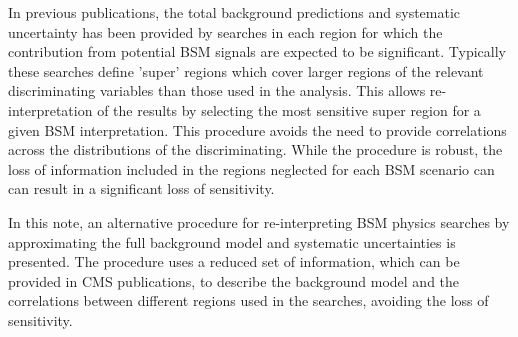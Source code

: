 In previous publications, the total background predictions  
and systematic uncertainty has been provided by searches in each region for which the contribution 
from potential BSM signals are expected to be significant. 
Typically these searches define 'super' regions which cover larger regions of the relevant discriminating variables 
than those used in the analysis. This allows re-interpretation of the results by selecting the most sensitive 
super region for a given BSM interpretation. This procedure avoids the need to provide correlations across the 
distributions of the discriminating. While the procedure is robust, the loss of information included in the regions 
neglected for each BSM scenario can can result in a significant loss of sensitivity. 

In this note, an alternative procedure for re-interpreting BSM physics searches by approximating
the full background model and systematic uncertainties is presented. The procedure uses a reduced 
set of information, which can be provided in CMS publications, to describe the background model 
and the correlations between different regions used in the searches, avoiding the loss of sensitivity.



